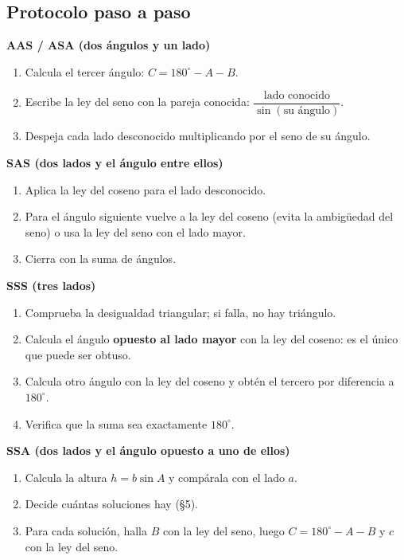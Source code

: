 \documentclass[12pt, letterpaper]{article}
\providecommand{\sen}{\sin}
\begin{document}
\subsection*{Protocolo paso a paso}

\begin{cuadropasos}
  \small
  \textbf{AAS / ASA (dos ángulos y un lado)}
  \begin{enumerate}[leftmargin=1.4em, nosep]
    \item Calcula el tercer ángulo: $C=180^{\circ}-A-B$.
    \item Escribe la ley del seno con la pareja conocida:
          $\dfrac{\text{lado conocido}}{\sen(\text{su ángulo})}$.
    \item Despeja cada lado desconocido multiplicando por el seno de su ángulo.
  \end{enumerate}
\end{cuadropasos}

\begin{cuadropasos}
  \small
  \textbf{SAS (dos lados y el ángulo entre ellos)}
  \begin{enumerate}[leftmargin=1.4em, nosep]
    \item Aplica la ley del coseno para el lado desconocido.
    \item Para el ángulo siguiente vuelve a la ley del coseno (evita la
          ambigüedad del seno) o usa la ley del seno con el lado mayor.
    \item Cierra con la suma de ángulos.
  \end{enumerate}
\end{cuadropasos}

\begin{cuadropasos}
  \small
  \textbf{SSS (tres lados)}
  \begin{enumerate}[leftmargin=1.4em, nosep]
    \item Comprueba la desigualdad triangular; si falla, no hay triángulo.
    \item Calcula el ángulo \textbf{opuesto al lado mayor} con la ley del
          coseno: es el único que puede ser obtuso.
    \item Calcula otro ángulo con la ley del coseno y obtén el tercero por
          diferencia a $180^{\circ}$.
    \item Verifica que la suma sea exactamente $180^{\circ}$.
  \end{enumerate}
\end{cuadropasos}

\begin{cuadropasos}
  \small
  \textbf{SSA (dos lados y el ángulo opuesto a uno de ellos)}
  \begin{enumerate}[leftmargin=1.4em, nosep]
    \item Calcula la altura $h=b\sen A$ y compárala con el lado $a$.
    \item Decide cuántas soluciones hay (§5).
    \item Para cada solución, halla $B$ con la ley del seno, luego
          $C=180^{\circ}-A-B$ y $c$ con la ley del seno.
  \end{enumerate}
\end{cuadropasos}
\end{document}
